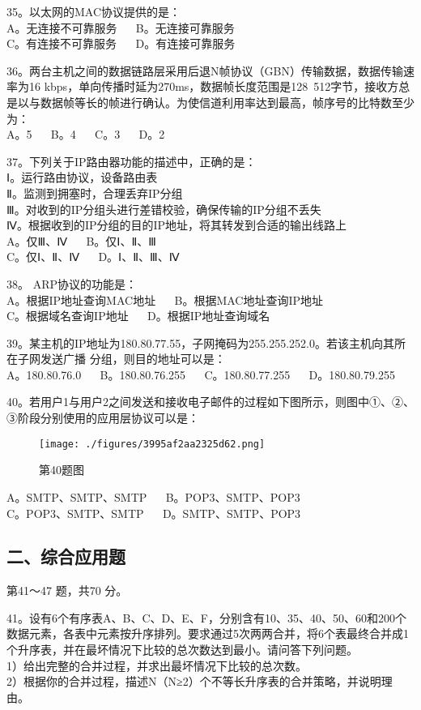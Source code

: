 35。以太网的MAC协议提供的是：\\
A。无连接不可靠服务 $\quad$ B。无连接可靠服务 \\
C。有连接不可靠服务 $\quad$ D。有连接可靠服务

36。两台主机之间的数据链路层采用后退N帧协议（GBN）传输数据，数据传输速率为16 kbps，单向传播时延为270ms，数据帧长度范围是128~512字节，接收方总是以与数据帧等长的帧进行确认。为使信道利用率达到最高，帧序号的比特数至少为： \\
A。5 $\quad$ B。4 $\quad$ C。3 $\quad$ D。2

37。下列关于IP路由器功能的描述中，正确的是：\\
Ⅰ。运行路由协议，设备路由表 \\
Ⅱ。监测到拥塞时，合理丢弃IP分组 \\
Ⅲ。对收到的IP分组头进行差错校验，确保传输的IP分组不丢失 \\
Ⅳ。根据收到的IP分组的目的IP地址，将其转发到合适的输出线路上 \\
A。仅Ⅲ、Ⅳ  $\quad$ B。仅Ⅰ、Ⅱ、Ⅲ \\
C。仅Ⅰ、Ⅱ、Ⅳ  $\quad$ D。Ⅰ、Ⅱ、Ⅲ、Ⅳ

38。 ARP协议的功能是：\\
A。根据IP地址查询MAC地址 $\quad$ B。根据MAC地址查询IP地址 \\
C。根据域名查询IP地址 $\quad$ D。根据IP地址查询域名

39。某主机的IP地址为180.80.77.55，子网掩码为255.255.252.0。若该主机向其所在子网发送广播
分组，则目的地址可以是：\\
A。180.80.76.0 $\quad$ B。180.80.76.255 $\quad$ C。180.80.77.255 $\quad$ D。180.80.79.255

40。若用户1与用户2之间发送和接收电子邮件的过程如下图所示，则图中①、②、③阶段分别使用的应用层协议可以是：\\
\begin{figure}[ht]
\centering
\texttt{[image: ./figures/3995af2aa2325d62.png]}
\caption{第40题图} \label{fig_CSN12_3}
\end{figure}
A。SMTP、SMTP、SMTP $\quad$ B。POP3、SMTP、POP3 \\
C。POP3、SMTP、SMTP $\quad$ D。SMTP、SMTP、POP3

\subsection{二、综合应用题}
第41～47 题，共70 分。

41。设有6个有序表A、B、C、D、E、F，分别含有10、35、40、50、60和200个数据元素，各表中元素按升序排列。要求通过5次两两合并，将6个表最终合并成1个升序表，并在最坏情况下比较的总次数达到最小。请问答下列问题。\\
1）给出完整的合并过程，并求出最坏情况下比较的总次数。\\
2）根据你的合并过程，描述N（N≥2）个不等长升序表的合并策略，并说明理由。


